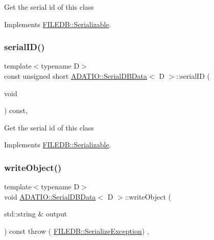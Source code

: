 Get the serial id of this class 

Implements \mbox{\hyperlink{classFILEDB_1_1Serializable_a5d639b5dbd5d8ebc7dca1eca31bbc868}{F\+I\+L\+E\+D\+B\+::\+Serializable}}.

\mbox{\label{classADATIO_1_1SerialDBData_a513643be38434a570d655602330aade9}} 
\subsubsection{\texorpdfstring{serialID()}{serialID()}\hspace{0.1cm}{\footnotesize\ttfamily [2/2]}}
{\footnotesize\ttfamily template$<$typename D$>$ \\
const unsigned short \mbox{\hyperlink{classADATIO_1_1SerialDBData}{A\+D\+A\+T\+I\+O\+::\+Serial\+D\+B\+Data}}$<$ D $>$\+::serial\+ID (\begin{DoxyParamCaption}\item[{void}]{ }\end{DoxyParamCaption}) const\hspace{0.3cm}{\ttfamily [inline]}, {\ttfamily [virtual]}}

Get the serial id of this class 

Implements \mbox{\hyperlink{classFILEDB_1_1Serializable_a5d639b5dbd5d8ebc7dca1eca31bbc868}{F\+I\+L\+E\+D\+B\+::\+Serializable}}.

\mbox{\label{classADATIO_1_1SerialDBData_a5266e4f1c065f0776f9974d6fad51a2f}} 
\subsubsection{\texorpdfstring{writeObject()}{writeObject()}\hspace{0.1cm}{\footnotesize\ttfamily [1/2]}}
{\footnotesize\ttfamily template$<$typename D$>$ \\
void \mbox{\hyperlink{classADATIO_1_1SerialDBData}{A\+D\+A\+T\+I\+O\+::\+Serial\+D\+B\+Data}}$<$ D $>$\+::write\+Object (\begin{DoxyParamCaption}\item[{std\+::string \&}]{output }\end{DoxyParamCaption}) const throw ( \mbox{\hyperlink{classFILEDB_1_1SerializeException}{F\+I\+L\+E\+D\+B\+::\+Serialize\+Exception}}) \hspace{0.3cm}{\ttfamily [inline]}, {\ttfamily [virtual]}}

